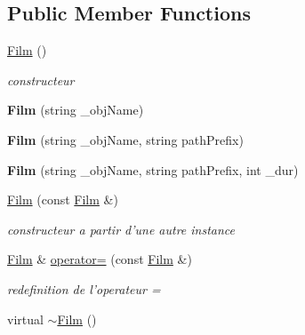 \subsection*{Public Member Functions}
\begin{DoxyCompactItemize}
\item 
\hypertarget{classFilm_af2835db2b0ef3a87aaa3222f4d9d1ae3}{\hyperlink{classFilm_af2835db2b0ef3a87aaa3222f4d9d1ae3}{Film} ()}\label{classFilm_af2835db2b0ef3a87aaa3222f4d9d1ae3}

\begin{DoxyCompactList}\small\item\em constructeur \end{DoxyCompactList}\item 
\hypertarget{classFilm_aa96dec38ef2e8db7fb03a68fc3d26da1}{{\bfseries Film} (string \-\_\-obj\-Name)}\label{classFilm_aa96dec38ef2e8db7fb03a68fc3d26da1}

\item 
\hypertarget{classFilm_a80fb97da0e99dffe97ea2eccc29c866f}{{\bfseries Film} (string \-\_\-obj\-Name, string path\-Prefix)}\label{classFilm_a80fb97da0e99dffe97ea2eccc29c866f}

\item 
\hypertarget{classFilm_a38f7d6e8e299bce1604f8300f60052f7}{{\bfseries Film} (string \-\_\-obj\-Name, string path\-Prefix, int \-\_\-dur)}\label{classFilm_a38f7d6e8e299bce1604f8300f60052f7}

\item 
\hypertarget{classFilm_a34c9de2efb9554ce1192e4110d98806b}{\hyperlink{classFilm_a34c9de2efb9554ce1192e4110d98806b}{Film} (const \hyperlink{classFilm}{Film} \&)}\label{classFilm_a34c9de2efb9554ce1192e4110d98806b}

\begin{DoxyCompactList}\small\item\em constructeur a partir d'une autre instance \end{DoxyCompactList}\item 
\hyperlink{classFilm}{Film} \& \hyperlink{classFilm_a2691ad8cf20210033cc35a6aa28e8553}{operator=} (const \hyperlink{classFilm}{Film} \&)
\begin{DoxyCompactList}\small\item\em redefinition de l'operateur = \end{DoxyCompactList}\item 
\hypertarget{classFilm_a8dab653f8a6c0635ca5ddbe0bbdd9a25}{virtual \hyperlink{classFilm_a8dab653f8a6c0635ca5ddbe0bbdd9a25}{$\sim$\-Film} ()}\label{classFilm_a8dab653f8a6c0635ca5ddbe0bbdd9a25}


\end{DoxyCompactItemize}
